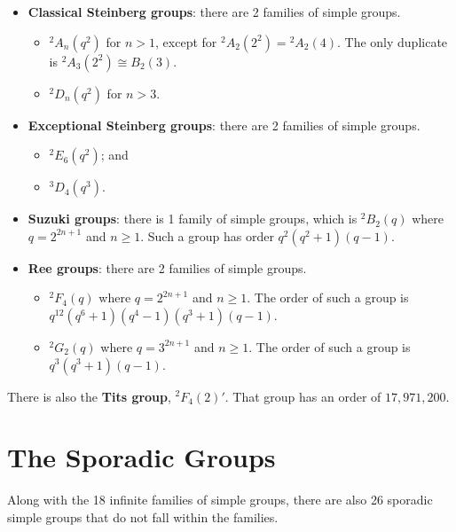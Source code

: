 \begin{itemize}
    \item \textbf{Classical Steinberg groups}: there are 2 families of simple groups.
    \begin{itemize}
        \item ${^2A_n(q^2)}$ for $n > 1$, except for ${^2A_2(2^2)} = {^2A_2(4)}$. The only duplicate is ${^2A_3(2^2)} \cong B_2(3)$.
        \item ${^2D_n(q^2)}$ for $n > 3$.
    \end{itemize}
    
    \item \textbf{Exceptional Steinberg groups}: there are 2 families of simple groups.
    \begin{itemize}
        \item ${^2E_6(q^2)}$; and
        \item ${^3D_4(q^3)}$.
    \end{itemize}
    
    \item \textbf{Suzuki groups}: there is 1 family of simple groups, which is ${^2B_2(q)}$ where $q = 2^{2n+1}$ and $n \geq 1$. Such a group has order $q^2(q^2+1)(q-1)$.

    \item \textbf{Ree groups}: there are 2 families of simple groups.
    \begin{itemize}
        \item $^2F_4(q)$ where $q = 2^{2n+1}$ and $n \geq 1$. The order of such a group is $q^{12}(q^6+1)(q^4-1)(q^3+1)(q-1)$.
        \item $^2G_2(q)$ where $q = 3^{2n+1}$ and $n \geq 1$. The order of such a group is $q^3(q^3+1)(q-1)$.
    \end{itemize}
\end{itemize}

There is also the \textbf{Tits group}, $^2F_4(2)'$. That group has an order of $17,971,200$.

\section{The Sporadic Groups}
Along with the 18 infinite families of simple groups, there are also 26 sporadic simple groups that do not fall within the families.

